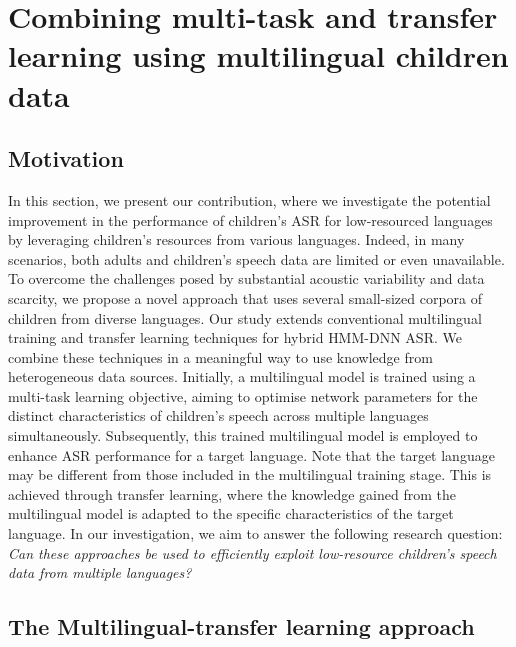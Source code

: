 \section{Combining multi-task and transfer learning using multilingual children data}
\subsection{Motivation}
In this section, we present our contribution, where we investigate the potential improvement in the performance of children's \ac{ASR} for low-resourced languages by leveraging children's resources from various languages. Indeed, in many scenarios, both adults and children's speech data are limited or even unavailable. To overcome the challenges posed by substantial acoustic variability and data scarcity, we propose a novel approach that uses several small-sized corpora of children from diverse languages. Our study extends conventional multilingual training and transfer learning techniques for hybrid \ac{HMM-DNN} \ac{ASR}. We combine these techniques in a meaningful way to use knowledge from heterogeneous data sources. Initially, a multilingual model is trained using a multi-task learning objective, aiming to optimise network parameters for the distinct characteristics of children's speech across multiple languages simultaneously. Subsequently, this trained multilingual model is employed to enhance \ac{ASR} performance for a target language. Note that the target language may be different from those included in the multilingual training stage. This is achieved through transfer learning, where the knowledge gained from the multilingual model is adapted to the specific characteristics of the target language. In our investigation, we aim to answer the following research question: \textit{Can these approaches be used to efficiently exploit low-resource children's speech data from multiple languages?} 


\subsection{The Multilingual-transfer learning approach}
\label{section:method}

